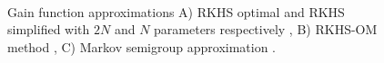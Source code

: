 \begin{figure}[htbp]
	\centering
	\mbox{
	}
	\mbox{
	}
	\mbox{
	}
	\caption[$\gradTD$-RKHS-OM performance with $N$ and $d$]{Gain function approximations A) RKHS optimal and RKHS simplified with $2N$ and $N$ parameters respectively \cite{radmey18a}, B) RKHS-OM method \cite{radmey19}, C) Markov semigroup approximation \cite{tagmeh16}.}
	\label{fig:diff_td_rkhs_coif_d2510}
\end{figure}

